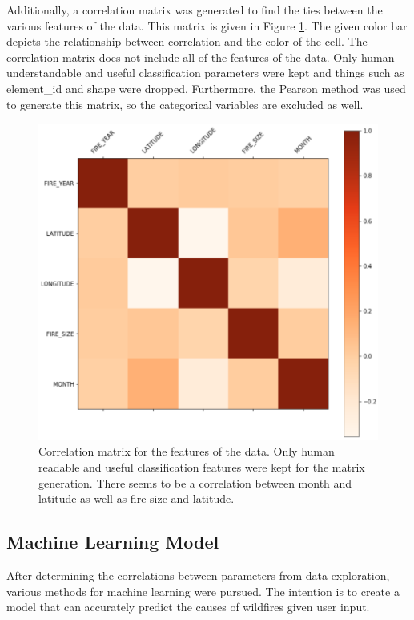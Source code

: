 \documentclass[conference]{IEEEtran}
\begin{document}
Additionally, a correlation matrix was generated to find the ties between the various features of the data. This matrix is given in Figure \ref{fig:correlation_matrix}. The given color bar depicts the relationship between correlation and the color of the cell. The correlation matrix does not include all of the features of the data. Only human understandable and useful classification parameters were kept and things such as element\_id and shape were dropped. Furthermore, the Pearson method was used to generate this matrix, so the categorical variables are excluded as well. \par

\begin{figure}
    \centering
    \includegraphics[scale=0.7]{img/correlation_matrix.PNG}
    \caption{Correlation matrix for the features of the data. Only human readable and useful classification features were kept for the matrix generation. There seems to be a correlation between month and latitude as well as fire size and latitude.}
    \label{fig:correlation_matrix}
\end{figure}

\subsection{Machine Learning Model}
After determining the correlations between parameters from data exploration, various methods for machine learning were pursued. The intention is to create a model that can accurately predict the causes of wildfires given user input. \par
\end{document}
